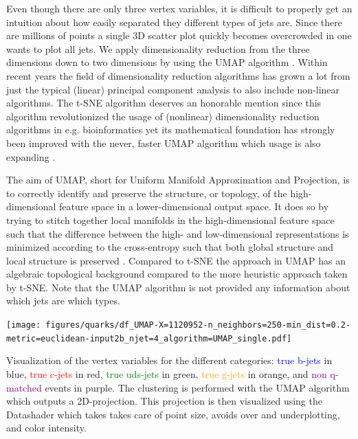 Even though there are only three vertex variables, it is difficult to properly get an intuition about how easily separated they different types of jets are. Since there are millions of points a single 3D scatter plot quickly becomes overcrowded in one wants to plot all jets. We apply dimensionality reduction from the three dimensions down to two dimensions by using the UMAP algorithm \autocite{mcinnesUMAPUniformManifold2018}. Within recent years the field of dimensionality reduction algorithms has grown a lot from just the typical (linear) principal component analysis to also include non-linear algorithms. The t-SNE algorithm \autocite{maatenVisualizingDataUsing2008} deserves an honorable mention since this algorithm revolutionized the usage of (nonlinear) dimensionality reduction algorithms in e.g. bioinformatics \citep{toghieshghiQuantitativeComparisonConventional2019, wallachProteinSmallmoleculeDatabase2009}  yet its mathematical foundation has strongly been improved with the never, faster UMAP algorithm \autocite{mcinnesUMAPUniformManifold2018} which usage is also expanding \citep{bechtEvaluationUMAPAlternative2018, bechtDimensionalityReductionVisualizing2019, diaz-papkovichUMAPRevealsCryptic2019}.

The aim of UMAP, short for Uniform Manifold Approximation and Projection, is to correctly identify and preserve the structure, or topology, of the high-dimensional feature space in a lower-dimensional output space. It does so by trying to stitch together local manifolds in the high-dimensional feature space such that the difference between the high- and low-dimensional representations is minimized according to the cross-entropy such that both global structure and local structure is preserved \citep{mcinnesUMAPUniformManifold2018}. Compared to t-SNE the approach in UMAP has an algebraic topological background compared to the more heuristic approach taken by t-SNE. Note that the UMAP algorithm is not provided any information about which jets are which types. 

\begin{marginfigure}
  \centerfloat
  \texttt{[image: figures/quarks/df\_UMAP-X=1120952-n\_neighbors=250-min\_dist=0.2-metric=euclidean-input2b\_njet=4\_algorithm=UMAP\_single.pdf]}
  \caption[UMAP visualization of vertex variables for 4-jet events]
          {Visualization of the vertex variables for the different categories: \textcolor{blue}{true b-jets} in blue, \textcolor{red}{true c-jets} in red, \textcolor{green}{true uds-jets} in green, \textcolor{orange}{true g-jets} in orange, and \textcolor{purple}{non q-matched} events in purple. The clustering is performed with the UMAP algorithm which outputs a 2D-projection. This projection is then visualized using the Datashader which takes takes care of point size, avoids over and underplotting, and color intensity.} 
  \label{fig:q:UMAP_vertex_2j}
\end{marginfigure}

